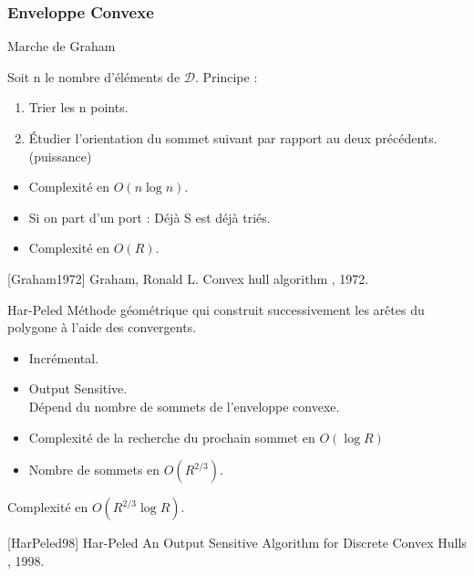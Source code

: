 \begin{frame}
\frametitle{Enveloppe Convexe}
\begin{block}{Marche de Graham}
{
  Soit n le nombre d'éléments de $\mathcal{D}$.
  Principe :
  \begin{enumerate}
    \item Trier les n points.
    \item Étudier l'orientation du sommet suivant par rapport au deux précédents. (puissance)
  \end{enumerate}
}  
  \begin{itemize}
    \item Complexité en $O(n \log n)$.
    \item Si on part d'un port : Déjà S est déjà triés.
    \item Complexité en $O(R)$.
  \end{itemize}
 
\end{block}

{
  \scriptsize
  \begin{thebibliography}{alpha}
    [Graham1972] Graham, Ronald L.
    \newblock Convex hull algorithm
    , 1972. 
  \end{thebibliography}
}
{
  \begin{block}{Har-Peled}  
    Méthode géométrique qui construit successivement les arêtes du polygone à l’aide des convergents.
    \begin{itemize}
      \item Incrémental.
      \item Output Sensitive.\\
      Dépend du nombre de sommets de l’enveloppe convexe.
    \end{itemize}  

    \begin{itemize}
      \item Complexité de la recherche du prochain sommet en $O(\log R)$
      \item Nombre de sommets en $O(R^{2/3})$. 
    \end{itemize}
    Complexité en $O(R^{2/3} \log R)$.
  \end{block}

  \scriptsize
  \begin{thebibliography}{alpha}
    [HarPeled98] Har-Peled
    \newblock An Output Sensitive Algorithm for Discrete Convex Hulls
    , 1998.
    \end{thebibliography}
}
\end{frame}




